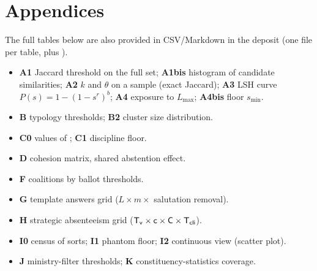 \section{Appendices}\label{sec:annexes-en}
The full tables below are also provided in CSV/Markdown in the deposit (one file per
table, plus ).
\begin{itemize}\small
  \item \textbf{A1} Jaccard threshold on the full set; \textbf{A1bis} histogram of
        candidate similarities; \textbf{A2} $k$ and $\theta$ on a sample (exact
        Jaccard); \textbf{A3} LSH curve $P(s)=1-(1-s^r)^b$; \textbf{A4} exposure to
        $L_{\max}$; \textbf{A4bis} floor $s_{\min}$.
  \item \textbf{B} typology thresholds; \textbf{B2} cluster size distribution.
  \item \textbf{C0} values of ; \textbf{C1} discipline
        floor.
  \item \textbf{D} cohesion matrix, \og{}shared abstention\fg{} effect.
  \item \textbf{F} \og{}coalitions by ballot\fg{} thresholds.
  \item \textbf{G} \og{}template answers\fg{} grid ($L\times m\times$ salutation
        removal).
  \item \textbf{H} \og{}strategic absenteeism\fg{} grid ($\mathsf{T_v}\times\mathsf{c}\times\mathsf{C}\times\mathsf{T_{cli}}$).
  \item \textbf{I0} census of sorts; \textbf{I1} phantom floor; \textbf{I2}
        continuous view (scatter plot).
  \item \textbf{J} ministry-filter thresholds; \textbf{K} constituency-statistics
        coverage.
\end{itemize}

